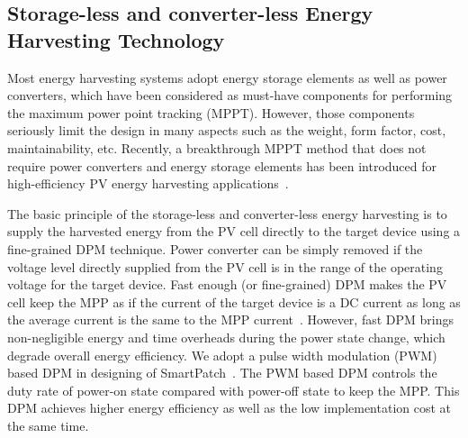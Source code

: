 \documentclass[journal]{IEEEtran}
\begin{document}
\subsection{Storage-less and converter-less Energy Harvesting Technology}
Most energy harvesting systems adopt energy storage elements as well as power converters, which have been considered as must-have components for performing the maximum power point tracking (MPPT). However, those components seriously limit the design in many aspects such as the weight, form factor, cost, maintainability, etc. Recently, a breakthrough MPPT method that does not require power converters and energy storage elements has been introduced for high-efficiency PV energy harvesting applications~\cite{Wang:ASPDAC14}.

The basic principle of the storage-less and converter-less energy harvesting is to supply the harvested energy from the PV cell directly to the target device using a fine-grained DPM technique. %
Power converter can be simply removed if the voltage level directly supplied from the PV cell is in the range of the operating voltage for the target device. 
Fast enough (or fine-grained) DPM makes the PV cell keep the MPP as if the current of the target device is a DC current as long as the average current is the same to the MPP current~\cite{Wang:ASPDAC14}. However, fast DPM brings non-negligible energy and time overheads during the power state change, which degrade overall energy efficiency. 
We adopt a pulse width modulation (PWM) based DPM in designing of SmartPatch~\cite{Lee:ASPDAC15}. The PWM based DPM controls the duty rate of power-on state compared with power-off state to keep the MPP. This DPM achieves higher energy efficiency as well as the low implementation cost at the same time.
\end{document}
